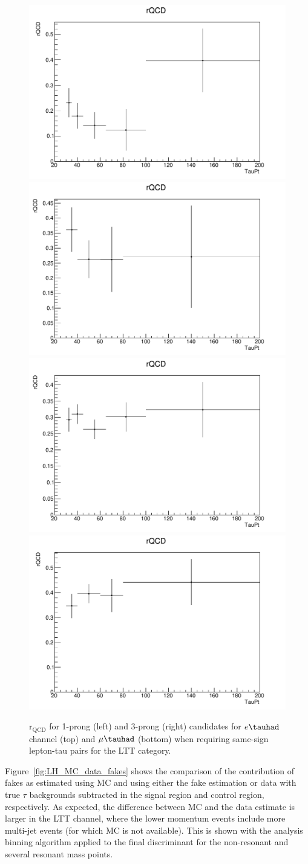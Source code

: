 \begin{figure}
\centering
\includegraphics[width=.4\textwidth]{figures/lephadFF/LTT/rQCD_All_Preselection_Np1_Elec_CR_2tag_TauPt}
\includegraphics[width=.4\textwidth]{figures/lephadFF/LTT/rQCD_All_Preselection_Np3_Elec_CR_2tag_TauPt} \\
\includegraphics[width=.4\textwidth]{figures/lephadFF/LTT/rQCD_All_Preselection_Np1_Muon_CR_2tag_TauPt}
\includegraphics[width=.4\textwidth]{figures/lephadFF/LTT/rQCD_All_Preselection_Np3_Muon_CR_2tag_TauPt}\\
\caption{$\mathrm{r}_{\mathrm{QCD}}$ for 1-prong (left) and 3-prong (right) \tauhad candidates for $e\tauhad$ channel (top) and $\mu\tauhad$ (bottom) when requiring same-sign lepton-tau pairs for the \lephad LTT category.}
\label{fig:LTT_rQCD}
\end{figure}

Figure~\ref{fig:LH_MC_data_fakes} shows the comparison of the contribution of fakes as estimated using MC and using either the fake estimation or data with true $\tau$ backgrounds subtracted in the signal region and control region, respectively. As expected, the difference between MC and the data estimate is larger in the LTT channel, where the lower momentum events include more multi-jet events (for which MC is not available). This is shown with the analysis binning algorithm applied to the final discriminant for the non-resonant and several resonant mass points.

